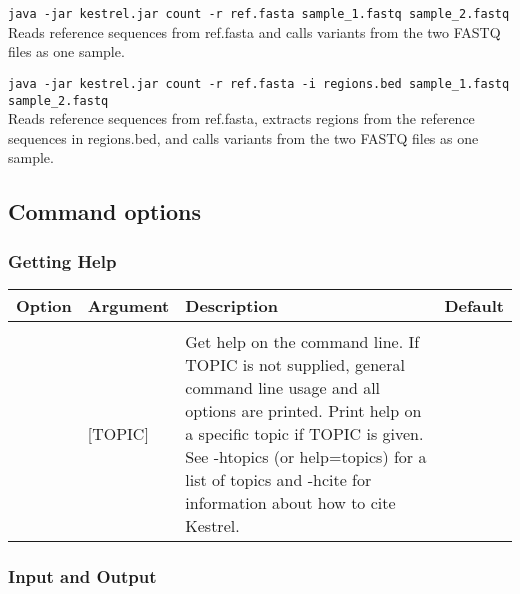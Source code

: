 \texttt{java -jar kestrel.jar count -r ref.fasta sample\_1.fastq sample\_2.fastq}\\
\hspace*{1cm}Reads reference sequences from ref.fasta and calls variants from the two FASTQ files as one sample.

\texttt{java -jar kestrel.jar count -r ref.fasta -i regions.bed sample\_1.fastq sample\_2.fastq}\\
\hspace*{1cm}Reads reference sequences from ref.fasta, extracts regions from the reference sequences in regions.bed, and calls variants from the two FASTQ files as one sample.


\subsection{Command options}
\label{sec.cmdline.opts}


\subsubsection{Getting Help}
\label{sec.cmdline.opts.help}

\begin{small}
	\begin{longtable}{|p{\optwidth}|p{\argwidth}|p{\dscwidth}|p{}|}
		\hline
		
		\textbf{Option} & \textbf{Argument} & \textbf{Description} & \textbf{Default} \\ \hline
	
		\optbox{\sopt{h}\\\lopt{help}} & [TOPIC] &
		Get help on the command line. If TOPIC is not supplied, general command line usage and all options are printed. Print help on a specific topic if TOPIC is given. See -htopics (or \ddash{}help=topics) for a list of topics and -hcite for information about how to cite Kestrel.
		&
		\\ \hline
		
	\end{longtable}
\end{small}


\subsubsection{Input and Output}
\label{sec.cmdline.opts.io}

